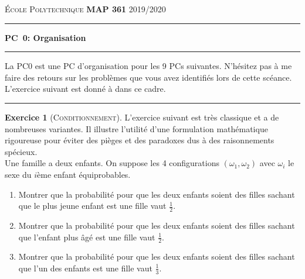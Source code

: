 \documentclass[11pt]{article}
\theoremstyle{definition}
\newtheorem{exercice}{Exercice}
\newcommand{\barre}{
\begin{center}
\rule{.3\linewidth}{1pt}
\end{center}
\medskip}
\begin{document}
\textsc{\'Ecole Polytechnique}\hskip 3.2cm {\bf MAP 361} \hskip 4.5cm
2019/2020 \par \hrule

\par\vspace{0.5cm}

\begin{center} {\bf \Large PC~0: Organisation}\end{center}

\barre %

La PC0 est une PC d'organisation pour les 9 PCs suivantes. N'h{\'e}sitez pas {\`a} me faire des retours sur les probl{\`e}mes que vous avez identifi{\'e}s lors de cette scéance. L'exercice suivant est donn{\'e} {\`a} dans ce cadre.

\barre %




\begin{exercice}[\textsc{Conditionnement}]
L'exercice suivant est tr\`es classique et a de nombreuses variantes. Il
illustre l'utilit\'e d'une formulation math\'ematique rigoureuse pour \'eviter
des pi\`eges et des paradoxes dus \`a des raisonnements sp\'ecieux.\\
Une famille a deux enfants. On suppose les 4 configurations
$(\omega_1,\omega_2)$ avec $\omega_i$ le sexe du $i$\`eme enfant \'equiprobables. 
\begin{enumerate}
\item Montrer que la probabilit\'e pour que les deux enfants soient des filles sachant que le plus jeune enfant est une fille vaut $\frac{1}{2}$.
\item Montrer que la probabilit\'e pour que les deux enfants soient des filles sachant que l'enfant plus âg\'e est une fille vaut $\frac{1}{2}$.
\item Montrer que la probabilit\'e pour que les deux enfants soient des filles sachant que l'un des enfants est une fille vaut $\frac{1}{3}$.
\end{enumerate}
\end{exercice}
\end{document}
